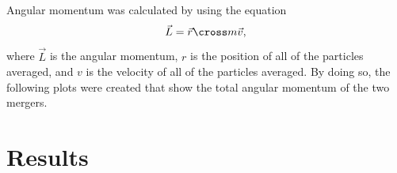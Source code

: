 \documentclass[12pt]{report}
\begin{document}
Angular momentum was calculated by using the equation
\begin{equation}\label{eqn:angularmomentum_eqn}
    \vec{L} = \vec{r} \cross m\vec{v},
\end{equation}
where $\vec{L}$ is the angular momentum, $r$ is the position of all of the particles averaged, and $v$ is the velocity of all of the particles averaged. By doing so, the following plots were created that show the total angular momentum of the two mergers.



\section*{Results}
\end{document}
